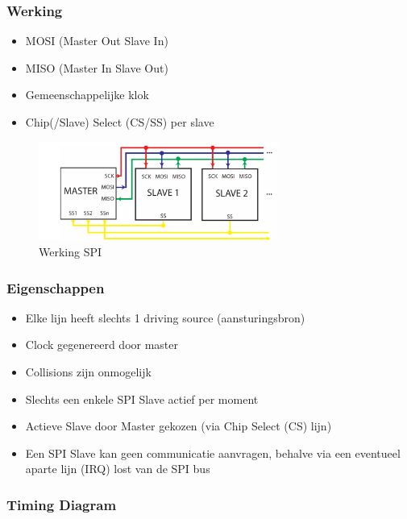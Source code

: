 \documentclass{article}
\begin{document}
\subsubsection{Werking}
\begin{itemize}
    \item MOSI (Master Out Slave In)
    \item MISO (Master In Slave Out)
    \item Gemeenschappelijke klok
    \item Chip(/Slave) Select (CS/SS) per slave
\end{itemize}

\begin{figure}[H]
    \centering
    \includegraphics[width=0.7\textwidth]{Screenshot_20200330_113936.png}
    \caption{Werking SPI}
\end{figure}

\subsubsection{Eigenschappen}

\begin{itemize}
    \item Elke lijn heeft slechts 1 driving source (aansturingsbron)
    \item Clock gegenereerd door master
    \item Collisions zijn onmogelijk
    \item Slechts een enkele SPI Slave actief per moment
    \item Actieve Slave door Master gekozen (via Chip Select (CS) lijn)
    \item Een SPI Slave kan geen communicatie aanvragen, behalve via een eventueel aparte lijn (IRQ) lost van de SPI bus
\end{itemize}

\subsubsection{Timing Diagram}
\end{document}
